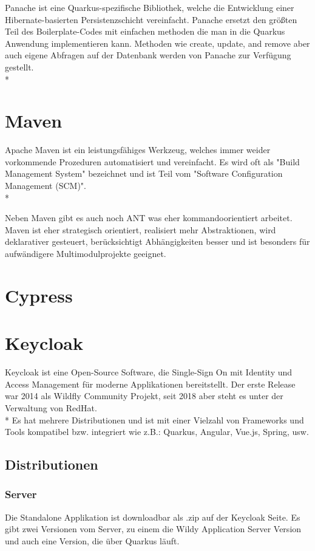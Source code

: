 Panache ist eine Quarkus-spezifische Bibliothek, welche die Entwicklung einer Hibernate-basierten Persistenzschicht vereinfacht. 
Panache ersetzt den größten Teil des Boilerplate-Codes mit einfachen methoden die man in die Quarkus Anwendung implementieren kann. 
Methoden wie create, update, and remove aber auch eigene Abfragen auf der Datenbank werden von Panache zur Verfügung gestellt. \\* \cite{Panache}

\section{Maven}
\author{David Ignjatovic}

Apache Maven ist ein leistungsfähiges Werkzeug, welches immer weider vorkommende Prozeduren automatisiert und vereinfacht. 
Es wird oft als "Build Management System" bezeichnet und ist Teil vom "Software Configuration Management (SCM)".  \\* \cite{Maven}

Neben Maven gibt es auch noch ANT was eher kommandoorientiert arbeitet. Maven ist eher strategisch orientiert, realisiert mehr Abstraktionen, wird deklarativer gesteuert, 
berücksichtigt Abhängigkeiten besser und ist besonders für aufwändigere Multimodulprojekte geeignet. \cite{Maven}


\section{Cypress}

\section{Keycloak}
\author{Benjamin Besic}
Keycloak ist eine Open-Source Software, die Single-Sign On mit Identity und Access Management für moderne Applikationen bereitstellt. Der erste Release war 2014 als Wildfly Community Projekt, seit 2018 aber steht es unter der Verwaltung von RedHat. \cite{KeycloakWiki}  \\* 
Es hat mehrere Distributionen und ist mit einer Vielzahl von Frameworks und Tools kompatibel bzw. integriert wie z.B.: Quarkus, Angular, Vue.js, Spring, usw. \cite{KeyCloakDZone}

\subsection{Distributionen}
\subsubsection{Server}
Die Standalone Applikation ist downloadbar als .zip auf der Keycloak Seite. Es gibt zwei Versionen vom Server, zu einem die Wildy Application Server Version und auch eine Version, die über Quarkus läuft.
